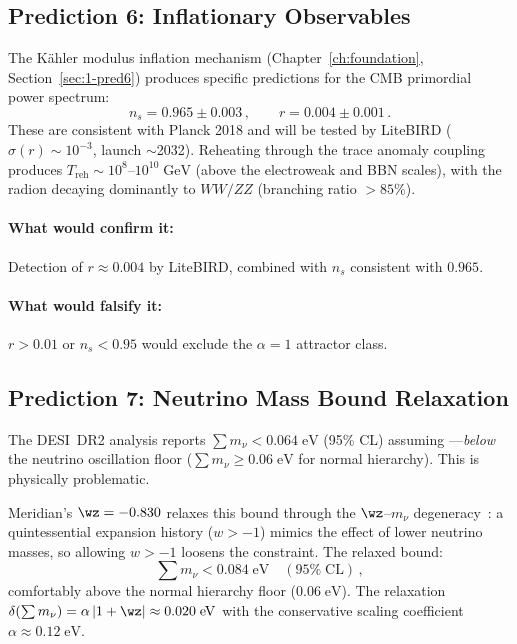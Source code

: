 \subsection{Prediction 6: Inflationary Observables}
\label{sec:2-pred6}

The K\"ahler modulus inflation mechanism (Chapter~\ref{ch:foundation}, Section~\ref{sec:1-pred6}) produces specific predictions for the CMB primordial power spectrum:
\begin{equation}
n_s = 0.965 \pm 0.003\,,\qquad r = 0.004 \pm 0.001\,.
\end{equation}
These are consistent with Planck 2018 and will be tested by LiteBIRD ($\sigma(r) \sim 10^{-3}$, launch $\sim$2032). Reheating through the trace anomaly coupling produces $T_\mathrm{reh} \sim 10^{8}$--$10^{10}\;\mathrm{GeV}$ (above the electroweak and BBN scales), with the radion decaying dominantly to $WW/ZZ$ (branching ratio $> 85\%$).

\paragraph{What would confirm it:} Detection of $r \approx 0.004$ by LiteBIRD, combined with $n_s$ consistent with $0.965$.

\paragraph{What would falsify it:} $r > 0.01$ or $n_s < 0.95$ would exclude the $\alpha = 1$ attractor class.

\subsection{Prediction 7: Neutrino Mass Bound Relaxation}
\label{sec:2-pred7}

The DESI~DR2 analysis reports $\sum m_\nu < 0.064\;\mathrm{eV}$ (95\% CL) assuming \LCDM{}---\emph{below} the neutrino oscillation floor ($\sum m_\nu \geq 0.06\;\mathrm{eV}$ for normal hierarchy). This is physically problematic.

Meridian's $\wz = -0.830$ relaxes this bound through the $\wz$--$m_\nu$ degeneracy~\cite{ch2:vagnozzi17}: a quintessential expansion history ($w > -1$) mimics the effect of lower neutrino masses, so allowing $w > -1$ loosens the constraint. The relaxed bound:
\begin{equation}
\label{eq:2-mnu-relaxed}
\sum m_\nu < 0.084\;\mathrm{eV}\quad (95\%\;\mathrm{CL})\,,
\end{equation}
comfortably above the normal hierarchy floor ($0.06\;\mathrm{eV}$). The relaxation $\delta(\sum m_\nu) = \alpha\,|1 + \wz| \approx 0.020\;\mathrm{eV}$ with the conservative scaling coefficient $\alpha \approx 0.12\;\mathrm{eV}$.


